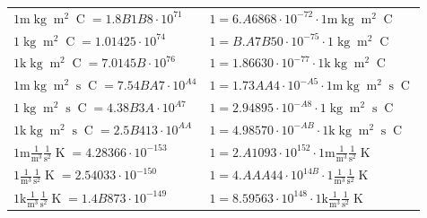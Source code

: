 \begin{center}
\begin{longtable}{l l}
{\color{gray}$1 \bm{\mathrm{ m}}\operatorname{kg}{\operatorname{m}^2}{}{\operatorname{C}}{} = 1.8B1B8\cdot10^{71} $}   & {\color{gray}$ 1 = 6.A6868\cdot10^{-72} \cdot 1 \bm{\mathrm{ m}}\operatorname{kg}{\operatorname{m}^2}{}{\operatorname{C}}{}$}  \\
{\color{black}$1 \bm{\mathrm{ }}\operatorname{kg}{\operatorname{m}^2}{}{\operatorname{C}}{} = 1.01425\cdot10^{74} $}   & {\color{black}$ 1 = B.A7B50\cdot10^{-75} \cdot 1 \bm{\mathrm{ }}\operatorname{kg}{\operatorname{m}^2}{}{\operatorname{C}}{}$}  \\
{\color{gray}$1 \bm{\mathrm{ k}}\operatorname{kg}{\operatorname{m}^2}{}{\operatorname{C}}{} = 7.0145B\cdot10^{76} $}   & {\color{gray}$ 1 = 1.86630\cdot10^{-77} \cdot 1 \bm{\mathrm{ k}}\operatorname{kg}{\operatorname{m}^2}{}{\operatorname{C}}{}$}  \\
{\color{gray}$1 \bm{\mathrm{ m}}\operatorname{kg}{\operatorname{m}^2}{\operatorname{s}}{\operatorname{C}}{} = 7.54BA7\cdot10^{A4} $}   & {\color{gray}$ 1 = 1.73AA4\cdot10^{-A5} \cdot 1 \bm{\mathrm{ m}}\operatorname{kg}{\operatorname{m}^2}{\operatorname{s}}{\operatorname{C}}{}$}  \\
{\color{black}$1 \bm{\mathrm{ }}\operatorname{kg}{\operatorname{m}^2}{\operatorname{s}}{\operatorname{C}}{} = 4.38B3A\cdot10^{A7} $}   & {\color{black}$ 1 = 2.94895\cdot10^{-A8} \cdot 1 \bm{\mathrm{ }}\operatorname{kg}{\operatorname{m}^2}{\operatorname{s}}{\operatorname{C}}{}$}  \\
{\color{gray}$1 \bm{\mathrm{ k}}\operatorname{kg}{\operatorname{m}^2}{\operatorname{s}}{\operatorname{C}}{} = 2.5B413\cdot10^{AA} $}   & {\color{gray}$ 1 = 4.98570\cdot10^{-AB} \cdot 1 \bm{\mathrm{ k}}\operatorname{kg}{\operatorname{m}^2}{\operatorname{s}}{\operatorname{C}}{}$}  \\
\hline{\color{gray}$1 \bm{\mathrm{ m}}\frac1{\operatorname{m}^3}\frac1{\operatorname{s}^2}{}{\operatorname{K}} = 4.28366\cdot10^{-153} $}   & {\color{gray}$ 1 = 2.A1093\cdot10^{152} \cdot 1 \bm{\mathrm{ m}}\frac1{\operatorname{m}^3}\frac1{\operatorname{s}^2}{}{\operatorname{K}}$}  \\
{\color{black}$1 \bm{\mathrm{ }}\frac1{\operatorname{m}^3}\frac1{\operatorname{s}^2}{}{\operatorname{K}} = 2.54033\cdot10^{-150} $}   & {\color{black}$ 1 = 4.AAA44\cdot10^{14B} \cdot 1 \bm{\mathrm{ }}\frac1{\operatorname{m}^3}\frac1{\operatorname{s}^2}{}{\operatorname{K}}$}  \\
{\color{gray}$1 \bm{\mathrm{ k}}\frac1{\operatorname{m}^3}\frac1{\operatorname{s}^2}{}{\operatorname{K}} = 1.4B873\cdot10^{-149} $}   & {\color{gray}$ 1 = 8.59563\cdot10^{148} \cdot 1 \bm{\mathrm{ k}}\frac1{\operatorname{m}^3}\frac1{\operatorname{s}^2}{}{\operatorname{K}}$}  \\

\end{longtable}
\end{center}

